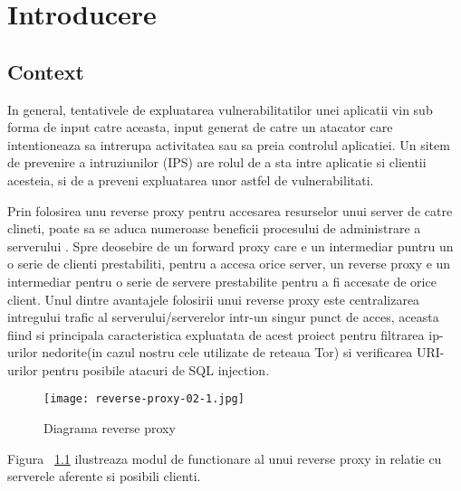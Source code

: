 
\chapter{Introducere}
\label{cap:Introducere}


\section{Context}

In general, tentativele de expluatarea vulnerabilitatilor unei aplicatii vin sub forma de input catre aceasta, input generat de catre un atacator care intentioneaza sa intrerupa activitatea sau sa preia controlul aplicatiei. Un sitem de prevenire a intruziunilor (IPS) are rolul de a sta intre aplicatie si clientii acesteia, si de a preveni expluatarea unor astfel de vulnerabilitati.

Prin folosirea unu reverse proxy pentru accesarea resurselor unui server de catre clineti, poate sa se aduca numeroase beneficii procesului de administrare a serverului \cite{top_8}. Spre deosebire de un forward proxy care e un intermediar puntru un o serie de clienti prestabiliti, pentru a accesa orice server, un reverse proxy e un intermediar pentru o serie de servere prestabilite pentru a fi accesate de orice client. Unul dintre avantajele folosirii unui reverse proxy este centralizarea intregului trafic al serverului/serverelor intr-un singur punct de acces, aceasta fiind si principala caracteristica expluatata de acest proiect pentru filtrarea ip-urilor nedorite(in cazul nostru cele utilizate de reteaua Tor) si verificarea URI-urilor pentru posibile atacuri de SQL injection.

\begin{figure}[h]
	\centering
	\texttt{[image: reverse-proxy-02-1.jpg]}
	\caption{Diagrama reverse proxy}
	\label{fig:reverse-proxy}
\end{figure}

Figura ~\ref{fig:reverse-proxy} ilustreaza modul de functionare al unui reverse proxy in relatie cu serverele aferente si posibili clienti. \\


